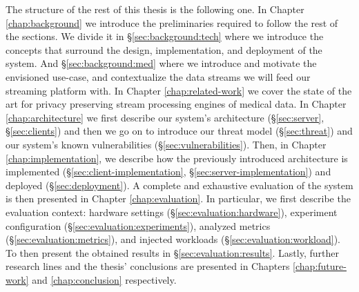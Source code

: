 The structure of the rest of this thesis is the following one.
In Chapter \ref{chap:background} we introduce the preliminaries required to follow the rest of the sections.
We divide it in \S\ref{sec:background:tech} where we introduce the concepts that surround the design, implementation, and deployment of the system.
And \S\ref{sec:background:med} where we introduce and motivate the envisioned use-case, and contextualize the data streams we will feed our streaming platform with.
In Chapter \ref{chap:related-work} we cover the state of the art for privacy preserving stream processing engines of medical data.
In Chapter \ref{chap:architecture} we first describe our system's architecture (\S\ref{sec:server}, \S\ref{sec:clients}) and then we go on to introduce our threat model (\S\ref{sec:threat}) and our system's known vulnerabilities (\S\ref{sec:vulnerabilities}).
Then, in Chapter \ref{chap:implementation}, we describe how the previously introduced architecture is implemented (\S\ref{sec:client-implementation}, \S\ref{sec:server-implementation}) and deployed (\S\ref{sec:deployment}).
A complete and exhaustive evaluation of the system is then presented in Chapter \ref{chap:evaluation}.
In particular, we first describe the evaluation context: hardware settings (\S\ref{sec:evaluation:hardware}), experiment configuration (\S\ref{sec:evaluation:experiments}), analyzed metrics (\S\ref{sec:evaluation:metrics}), and injected workloads (\S\ref{sec:evaluation:workload}).
To then present the obtained results in \S\ref{sec:evaluation:results}.
Lastly, further research lines and the thesis' conclusions are presented in Chapters \ref{chap:future-work} and \ref{chap:conclusion} respectively.
